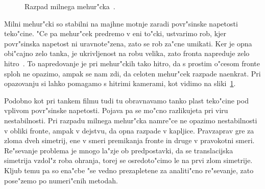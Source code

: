 \documentclass[a4paper,10pt]{article}
\begin{document}
\begin{figure}[h]
 \centering
{}
\caption{Razpad milnega mehur"cka~\cite{slike-mehurcek}. }
\label{fig:mehurcek-3}
\end{figure}

Milni mehur"cki so stabilni na majhne motnje zaradi povr"sinske napetosti teko"cine. "Ce pa mehur"cek predremo v eni to"cki, ustvarimo rob, kjer povr"sinska napetost ni uravnote"zena, zato se rob za"cne umikati. Ker je opna obi"cajno zelo tanka, je ukrivljenost na robu velika, zato fronta napreduje zelo hitro~\cite{diploma}. To napredovanje je pri mehur"ckih tako hitro, da s prostim o"cesom fronte sploh ne opazimo, ampak se nam zdi, da celoten mehur"cek razpade naenkrat. Pri opazovanju si lahko pomagamo s hitrimi kamerami, kot vidimo na sliki~\ref{fig:mehurcek-3}. 

Podobno kot pri tankem filmu tudi tu obravnavamo tanko plast teko"cine pod vplivom povr"sinske napetosti. Pojava pa se mo"cno razlikujeta pri viru nestabilnosti. Pri razpadu milnega mehur"cka namre"ce ne opazimo nestabilnosti v obliki fronte, ampak v dejstvu, da opna razpade v kapljice. Pravzaprav gre za zloma dveh simetrij, ene v smeri premikanja fronte in druge v pravokotni smeri. Re"sevanje problema je mnogo la"zje ob predpostavki, da se translacijska simetrija vzdol"z roba ohranja, torej se osredoto"cimo le na prvi zlom simetrije. Kljub temu pa so ena"cbe "se vedno prezapletene za analiti"cno re"sevanje, zato pose"zemo po numeri"cnih metodah. 
\end{document}
